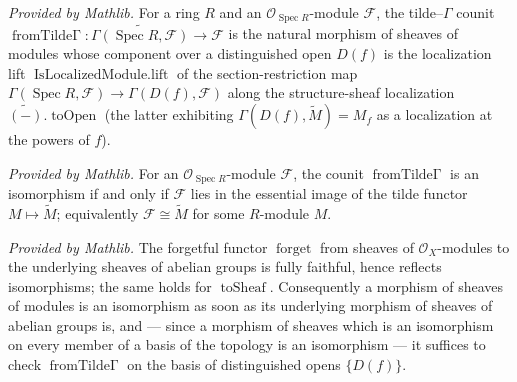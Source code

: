 \begin{lemma}
  \label{lem:fromTildeGamma_mathlib}
  \mathlibok
  \textit{Provided by Mathlib.}
  For a ring \(R\) and an \(\mathcal{O}_{\operatorname{Spec} R}\)-module \(\mathcal{F}\), the
  tilde--\(\Gamma\) counit
  \(\operatorname{fromTilde\Gamma} : \widetilde{\Gamma(\operatorname{Spec} R, \mathcal{F})} \to
  \mathcal{F}\) is the natural morphism of sheaves of modules whose component over a distinguished
  open \(D(f)\) is the localization lift \(\operatorname{IsLocalizedModule.lift}\) of the
  section-restriction map \(\Gamma(\operatorname{Spec} R, \mathcal{F}) \to \Gamma(D(f), \mathcal{F})\)
  along the structure-sheaf localization \(\widetilde{(-)}.\operatorname{toOpen}\) (the latter
  exhibiting \(\Gamma(D(f), \widetilde{M}) = M_f\) as a localization at the powers of \(f\)).
\end{lemma}

\begin{lemma}
  \label{lem:isIso_fromTildeGamma_iff_mathlib}
  \mathlibok
  \textit{Provided by Mathlib.}
  For an \(\mathcal{O}_{\operatorname{Spec} R}\)-module \(\mathcal{F}\), the counit
  \(\operatorname{fromTilde\Gamma}\) is an isomorphism if and only if \(\mathcal{F}\) lies in the
  essential image of the tilde functor \(M \mapsto \widetilde{M}\); equivalently
  \(\mathcal{F} \cong \widetilde{M}\) for some \(R\)-module \(M\).
\end{lemma}

\begin{lemma}
  \label{lem:forget_reflectsIso_mathlib}
  \mathlibok
  \textit{Provided by Mathlib.}
  The forgetful functor \(\operatorname{forget}\) from sheaves of \(\mathcal{O}_X\)-modules to the
  underlying sheaves of abelian groups is fully faithful, hence reflects isomorphisms; the same holds
  for \(\operatorname{toSheaf}\). Consequently a morphism of sheaves of modules is an isomorphism as
  soon as its underlying morphism of sheaves of abelian groups is, and — since a morphism of sheaves
  which is an isomorphism on every member of a basis of the topology is an isomorphism — it suffices
  to check \(\operatorname{fromTilde\Gamma}\) on the basis of distinguished opens \(\{D(f)\}\).
\end{lemma}


